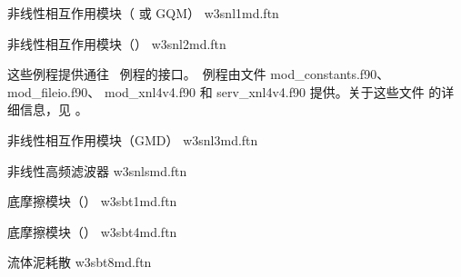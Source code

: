 \noindent
非线性相互作用模块（\dia{} 或 GQM） \hfill {\file w3snl1md.ftn}

\begin{flisti}
\end{flisti}

\noindent
非线性相互作用模块（\xnl{}） \hfill {\file w3snl2md.ftn}

\begin{flisti}
\end{flisti}
这些例程提供通往 \xnl\ 例程的接口。\xnl\ 例程由文件
{\file mod\_constants.f90}、{\file mod\_fileio.f90}、
{\file mod\_xnl4v4.f90} 和 {\file serv\_xnl4v4.f90} 提供。关于这些文件
的详细信息，见 \cite{rep:vVl02b}。

\vspace{\baselineskip}
\noindent
非线性相互作用模块（GMD） \hfill {\file w3snl3md.ftn}

\begin{flisti}
\end{flisti}

\vspace{\baselineskip}
\noindent
非线性高频滤波器 \hfill {\file w3snlsmd.ftn}

\begin{flisti}
\end{flisti}

\noindent
底摩擦模块（\js{}） \hfill {\file w3sbt1md.ftn}

\begin{flisti}
\end{flisti}

\noindent
底摩擦模块（\showex{}） \hfill {\file w3sbt4md.ftn}

\begin{flisti}
\end{flisti}

\noindent
流体泥耗散 \citep{art:DL78}  \hfill {\file w3sbt8md.ftn}

